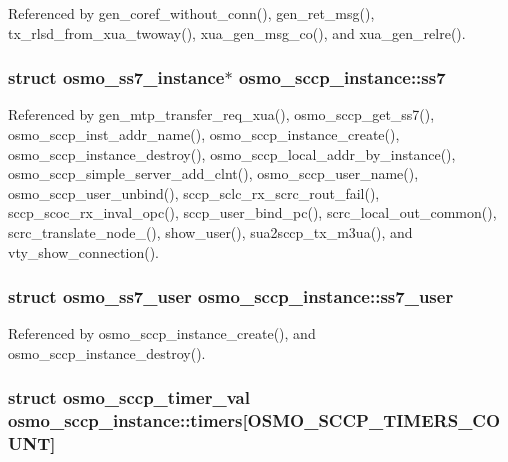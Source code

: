 Referenced by gen\+\_\+coref\+\_\+without\+\_\+conn(), gen\+\_\+ret\+\_\+msg(), tx\+\_\+rlsd\+\_\+from\+\_\+xua\+\_\+twoway(), xua\+\_\+gen\+\_\+msg\+\_\+co(), and xua\+\_\+gen\+\_\+relre().

\subsubsection[{ss7}]{\setlength{\rightskip}{0pt plus 5cm}struct {\bf osmo\+\_\+ss7\+\_\+instance}$\ast$ osmo\+\_\+sccp\+\_\+instance\+::ss7}\label{structosmo__sccp__instance_a3c065fc49cb0617c9b7d7f0b5c01c6b9}


Referenced by gen\+\_\+mtp\+\_\+transfer\+\_\+req\+\_\+xua(), osmo\+\_\+sccp\+\_\+get\+\_\+ss7(), osmo\+\_\+sccp\+\_\+inst\+\_\+addr\+\_\+name(), osmo\+\_\+sccp\+\_\+instance\+\_\+create(), osmo\+\_\+sccp\+\_\+instance\+\_\+destroy(), osmo\+\_\+sccp\+\_\+local\+\_\+addr\+\_\+by\+\_\+instance(), osmo\+\_\+sccp\+\_\+simple\+\_\+server\+\_\+add\+\_\+clnt(), osmo\+\_\+sccp\+\_\+user\+\_\+name(), osmo\+\_\+sccp\+\_\+user\+\_\+unbind(), sccp\+\_\+sclc\+\_\+rx\+\_\+scrc\+\_\+rout\+\_\+fail(), sccp\+\_\+scoc\+\_\+rx\+\_\+inval\+\_\+opc(), sccp\+\_\+user\+\_\+bind\+\_\+pc(), scrc\+\_\+local\+\_\+out\+\_\+common(), scrc\+\_\+translate\+\_\+node\+\_(), show\+\_\+user(), sua2sccp\+\_\+tx\+\_\+m3ua(), and vty\+\_\+show\+\_\+connection().

\subsubsection[{ss7\+\_\+user}]{\setlength{\rightskip}{0pt plus 5cm}struct {\bf osmo\+\_\+ss7\+\_\+user} osmo\+\_\+sccp\+\_\+instance\+::ss7\+\_\+user}\label{structosmo__sccp__instance_aba449483a0ab1ec8a6674735d215c7c8}


Referenced by osmo\+\_\+sccp\+\_\+instance\+\_\+create(), and osmo\+\_\+sccp\+\_\+instance\+\_\+destroy().

\subsubsection[{timers}]{\setlength{\rightskip}{0pt plus 5cm}struct {\bf osmo\+\_\+sccp\+\_\+timer\+\_\+val} osmo\+\_\+sccp\+\_\+instance\+::timers[{\bf O\+S\+M\+O\+\_\+\+S\+C\+C\+P\+\_\+\+T\+I\+M\+E\+R\+S\+\_\+\+C\+O\+U\+NT}]}\label{structosmo__sccp__instance_a433533654d1919c1a63a24f39f892761}


